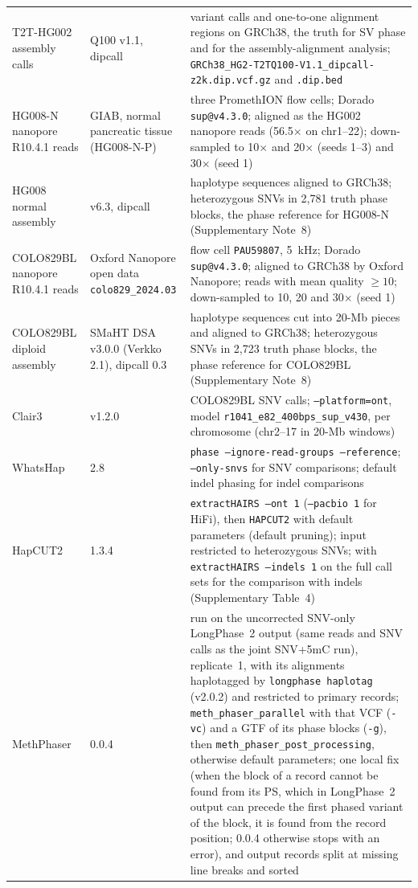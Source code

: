 \documentclass[11pt,a4paper]{article}
\newcommand{\toolname}{LongPhase~2\xspace}
\newcommand{\code}[1]{\texttt{\small #1}}
\begin{document}
{\begin{longtable}{@{}L{4cm} L{2.6cm} L{8.8cm}@{}}
T2T-HG002 assembly calls\cite{hansen2026q100,li2018dipcall} & Q100 v1.1, dipcall & variant calls and one-to-one alignment regions on GRCh38, the truth for SV phase and for the assembly-alignment analysis; \code{GRCh38\_HG2-T2TQ100-V1.1\_}\allowbreak\code{dipcall-z2k.dip.vcf.gz} and \code{.dip.bed} \\
HG008-N nanopore R10.4.1 reads\cite{mcdaniel2025hg008} & GIAB, normal pancreatic tissue (HG008-N-P) & three PromethION flow cells; Dorado \code{sup@v4.3.0}; aligned as the HG002 nanopore reads (56.5$\times$ on chr1--22); down-sampled to 10$\times$ and 20$\times$ (seeds 1--3) and 30$\times$ (seed 1) \\
HG008 normal assembly\cite{wagner2026hg008asm,li2018dipcall} & v6.3, dipcall & haplotype sequences aligned to GRCh38; heterozygous SNVs in 2,781 truth phase blocks, the phase reference for HG008-N (Supplementary Note~8) \\
COLO829BL nanopore R10.4.1 reads & Oxford Nanopore open data \code{colo829\_2024.03} & flow cell \code{PAU59807}, 5~kHz; Dorado \code{sup@v4.3.0}; aligned to GRCh38 by Oxford Nanopore; reads with mean quality $\ge 10$; down-sampled to 10, 20 and 30$\times$ (seed 1) \\
COLO829BL diploid assembly\cite{sohn2026colo829,li2018dipcall} & SMaHT DSA v3.0.0 (Verkko 2.1), dipcall 0.3 & haplotype sequences cut into 20-Mb pieces and aligned to GRCh38; heterozygous SNVs in 2,723 truth phase blocks, the phase reference for COLO829BL (Supplementary Note~8) \\
Clair3\cite{zheng2022clair3} & v1.2.0 & COLO829BL SNV calls; \code{--platform=ont}, model \code{r1041\_e82\_400bps\_sup\_v430}, per chromosome (chr2--17 in 20-Mb windows) \\
WhatsHap & 2.8 & \code{phase --ignore-read-groups --reference}; \code{--only-snvs} for SNV comparisons; default indel phasing for indel comparisons \\
HapCUT2 & 1.3.4 & \code{extractHAIRS --ont 1} (\code{--pacbio 1} for HiFi), then \code{HAPCUT2} with default parameters (default pruning); input restricted to heterozygous SNVs; with \code{extractHAIRS --indels 1} on the full call sets for the comparison with indels (Supplementary Table~4) \\
MethPhaser & 0.0.4 & run on the uncorrected SNV-only \toolname output (same reads and SNV calls as the joint SNV+5mC run), replicate~1, with its alignments haplotagged by \code{longphase haplotag} (v2.0.2) and restricted to primary records; \code{meth\_phaser\_parallel} with that VCF (\code{-vc}) and a GTF of its phase blocks (\code{-g}), then \code{meth\_phaser\_post\_processing}, otherwise default parameters; one local fix (when the block of a record cannot be found from its PS, which in \toolname output can precede the first phased variant of the block, it is found from the record position; 0.0.4 otherwise stops with an error), and output records split at missing line breaks and sorted \\

\end{longtable}}
\end{document}
